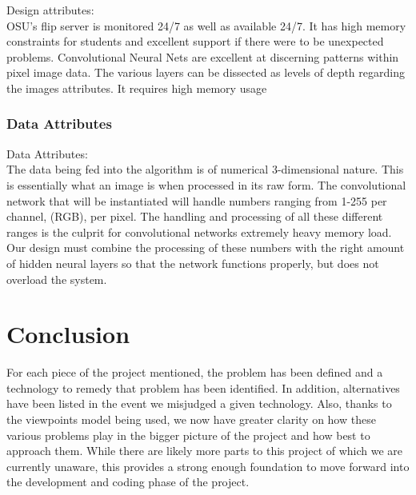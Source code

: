 \documentclass[onecolumn, draftclsnofoot,10pt, compsoc]{IEEEtran}
\begin{document}
	Design attributes:\\
	OSU’s flip server is monitored 24/7 as well as available 24/7. It has high memory constraints for students and excellent support if there were to be unexpected problems. Convolutional Neural Nets are excellent at discerning patterns within pixel image data. The various layers can be dissected as levels of depth regarding the images attributes. It requires high memory usage\\

\subsubsection{Data Attributes}
Data Attributes:\\
	The data being fed into the algorithm is of numerical 3-dimensional nature. This is essentially what an image is when processed in its raw form. The convolutional network that will be instantiated will handle numbers ranging from 1-255 per channel, (RGB), per pixel. The handling and processing of all these different ranges is the culprit for convolutional networks extremely heavy memory load. Our design must combine the processing of these numbers with the right amount of hidden neural layers so that the network functions properly, but does not overload the system.\\


\section{Conclusion}
For each piece of the project mentioned, the problem has been defined and a technology to remedy that problem has been identified. In addition, alternatives have been listed in the event we misjudged a given technology. Also, thanks to the viewpoints model being used, we now have greater clarity on how these various problems play in the bigger picture of the project and how best to approach them. While there are likely more parts to this project of which we are currently unaware, this provides a strong enough foundation to move forward into the development and coding phase of the project.
\end{document}
